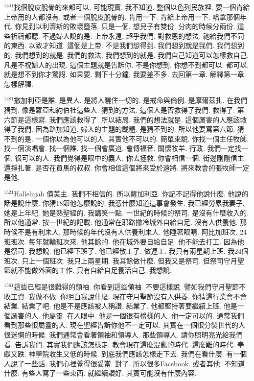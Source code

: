 \documentclass{book}
\begin{document}
$^{1441}$找個脫皮脫骨的來都可以.
可能現實.
我不知道.
整個以色列民族裡.
要一個肯給上帝用的人都沒有.
或者一個脫皮脫骨的.
肯用一下.
肯給上帝用一下.
哈拿那個年代.
你見到以利濟斯的敗壞墮落.
只是一個.
想兒子有雙份.
分肉的時候分兩份.
這些祈禱都聽.
不過婦人說的是.
上帝永遠.
超乎我們.
對救恩的想法.
祂給我們不同的東西.
以致才知道.
這個是上帝.
不是我們想得到.
我們想到就是我們.
我們想到的.
我們想到的就是.
我們的救法.
我們想到的就是.
我們自己知道可以怎樣救自己.
凡是不祝婦人的出現.
這個主題就是告訴你.
不是你想到.
你想不到都可以.
都可以.
就是想不到你才驚訝.
如果要.
剩下十分鐘.
我要差不多.
去回第一章.
解釋第一章.
怎樣解釋.

$^{1481}$撒加利亞是誰.
是異人.
是將人曬住一切的.
是戒命與倫例.
是摩爾茲扎.
在我們猜到.
像是羅亞和約伯社這些人.
猜到的方法.
這個人是否救得了我們.
救得了.
第六節是這樣寫.
我們應該救得了.
所以結局.
我們的想法就是.
這個厲害的人應該救得了我們.
因為路加知道.
婦人的主題的載體.
是猜不到的.
所以他要寫第六節.
猜不到的是.
一個你以為他可以的人.
其實他不可以的.
簡單來說.
你找一個主任牧師.
找一個演唱會.
找一個誰.
找一個會廣道.
會傳福音.
關懷牧羊.
行政.
我們一定找一個.
很可以的人.
我們覺得是眼中的義人.
你去拯救.
你會相信一個.
街邊剛剛信主.
還掙扎著.
是否在買馬的叔叔.
你會相信這個將來受於遠將.
將來教會的張牧師一定是他.

$^{1521}$Hallelujah 債美主.
我們不相信的.
所以薩加利亞.
你記不記得他說什麼.
他說的話是說什麼.
你猜18節他怎麼說的.
我憑什麼知道這事會發生.
我已經勞累我妻子.
她是上年紀.
她是熟聖經的.
我講笑一點.
一世紀的時候的祭司.
是沒有什麼收入的.
所以他通常.
按一世紀的記載.
他通常在耶路撒冷城外自給自足.
沒有人供養他.
那時候不是有利未人.
那時候的年代沒有人供養利未人.
他睡著眼睛.
阿比加班次.
24班班次.
每年就輪班次來.
他其餘的.
他在城外要自給自足.
他不能去打工.
因為他是祭司.
我想說.
他已經下班了.
他已經散工了.
做運工.
我只有兩星期上班.
我24個班次.
只上一個班次.
我只上兩星期.
我其餘做什麼.
但我又是祭司.
但祭司守月聖節就不能做外面的工作.
只有自給自足養活自己.
我想說.

$^{1561}$這些已經是很難得的領袖.
你看到這些領袖.
不要這樣說.
譬如我們守月聖節不收工資.
我做不做.
你明白我說什麼.
現在守月聖節沒有人供養.
你猜這行業會不會結業.
結業了吧.
他是不是應該被人稱讚.
結業了.
他都堅持著要繼續上班.
他是一個厲害的人.
他屬靈.
在人眼中.
他是一個很有榜樣的人.
他一定可以的.
通常我們看到那些很屬靈的人.
現在聖經告訴你他不一定可以.
其實在一個很分裂世代的人很迷惘的時候.
我們通常會看著領袖和領導人.
那些領導人.
請你照明亮光給我們看.
告訴我們.
其實我們應該怎樣走.
教會現在這麼混亂的時代.
這麼難的時代.
奉獻又跌.
神學院收生又低的時候.
到底我們應該怎樣走下去.
我們在看什麼.
有一個人說了一些話.
我們心裡覺得很妥當.
對了.
所以很多Facebook.
或者其他.
不知道什麼.
有些人寫了一些東西.
就繼續讚好.
其實可能沒有什麼內容.
\end{document}
